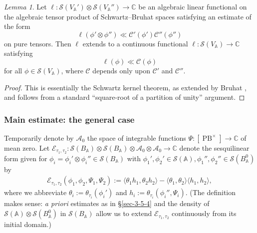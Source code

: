 \documentclass[reqno,10pt]{amsart}
\theoremstyle{plain} %
\theoremstyle{definition}
\theoremstyle{plain} %
\theoremstyle{remark}
\theoremstyle{itplain} %
\newtheorem*{lemma*}{Lemma}
\theoremstyle{remark} %
\numberwithin{equation}{section}
\def\PB{\operatorname{PB}}
\begin{document}
\begin{lemma*}\label{lem:quantitative-factorization}
  Let $\ell : \mathcal{S}(V_\mathbb{A} ') \otimes \mathcal{S}(V_\mathbb{A} '') \rightarrow \mathbb{C}$ be an algebraic linear functional on the algebraic tensor product of Schwartz--Bruhat spaces satisfying an estimate of the form
  \begin{equation*}
    \ell(\phi' \otimes \phi '') \ll \mathcal{C}'(\phi ') \mathcal{C}''(\phi '')
  \end{equation*}
  on pure tensors.
  Then $\ell$ extends to a continuous functional $\ell : \mathcal{S}(V_\mathbb{A}) \rightarrow \mathbb{C}$ satisfying
  \[
    \ell(\phi) \ll \mathcal{C}(\phi)
  \]
  for all $\phi \in \mathcal{S}(V_\mathbb{A})$, where $\mathcal{C}$ depends only upon $\mathcal{C} '$ and $\mathcal{C} ''$.
\end{lemma*}
\begin{proof}
  This is essentially the Schwartz kernel theorem, as extended by Bruhat \cite[\S5]{MR0140941}, and follows from a standard ``square-root of a partition of unity'' argument.
\end{proof}


\subsubsection{Main estimate: the general case\label{sec:main-estimate-for-equidistribution-pairs-theta}}
\label{sec-3-5-5}
Temporarily denote by $\mathcal{A}_0$ the space of integrable functions $\Psi : [\PB^\times] \rightarrow \mathbb{C}$ of mean zero.  Let $\mathcal{E}_{\tau_1,\tau_2} : \mathcal{S}(B_\mathbb{A}) \otimes \mathcal{S}(B_\mathbb{A}) \otimes \mathcal{A}_0 \otimes \mathcal{A}_0 \rightarrow \mathbb{C}$ denote the sesquilinear form given for $\phi_i = \phi_i' \otimes \phi_i'' \in \mathcal{S}(B_\mathbb{A})$ with $\phi_1',\phi_2' \in \mathcal{S}(\mathbb{A}), \phi_1'',\phi_2'' \in \mathcal{S}(B_\mathbb{A}^0)$ by
\begin{align*}
  \mathcal{E}_{\tau_1,\tau_2}(\phi_1,
  \phi_2,
  \Psi_1, \Psi_2)
  :=
  \langle
  \theta_1 h_1, \theta_2 h_2 \rangle
  - \langle \theta_1, \theta_2 \rangle
  \langle h_1, h_2 \rangle,
\end{align*}
where we abbreviate $\theta_i := \theta_{\tau_i}(\phi_i')$ and $h_i := \theta_{\tau_i}(\phi_i'',\Psi_i)$.  (The definition makes sense: \emph{a priori} estimates as in \S\ref{sec-3-5-4} and the density of $\mathcal{S}(\mathbb{A}) \otimes \mathcal{S}(B_\mathbb{A}^0)$ in $\mathcal{S}(B_\mathbb{A})$ allow us to extend $\mathcal{E}_{\tau_1,\tau_2}$ continuously from its initial domain.)
\end{document}

